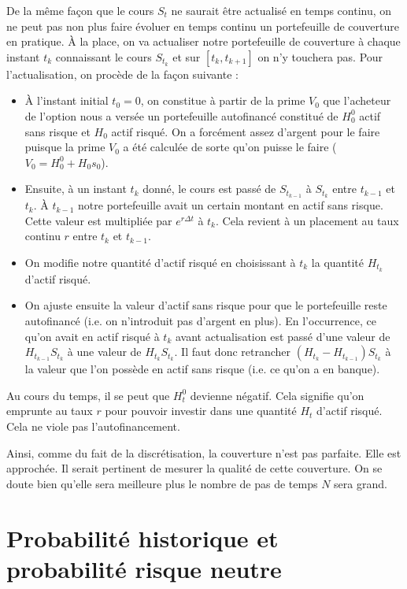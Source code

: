 \documentclass[12pt]{article}
\begin{document}
De la même façon que le cours $S_t$ ne saurait être actualisé en temps continu, on ne peut pas non plus faire évoluer en temps continu un portefeuille de couverture en pratique. À la place, on va actualiser notre portefeuille de couverture à chaque instant $t_k$ connaissant le cours $S_{t_k}$ et sur $[t_k, t_{k+1}]$ on n'y touchera pas. Pour l'actualisation, on procède de la façon suivante :
\begin{itemize}
    \item À l'instant initial $t_0=0$, on constitue à partir de la prime $V_0$ que l'acheteur de l'option nous a versée un portefeuille autofinancé constitué de $H^0_0$ actif sans risque et $H_0$ actif risqué. On a forcément assez d'argent pour le faire puisque la prime $V_0$ a été calculée de sorte qu'on puisse le faire ($V_0=H^0_0+H_0 s_0$).
    \item Ensuite, à un instant $t_k$ donné, le cours est passé de $S_{t_{k-1}}$ à $S_{t_k}$ entre $t_{k-1}$ et $t_k$. À $t_{k-1}$ notre portefeuille avait un certain montant en actif sans risque. Cette valeur est multipliée par $e^{r \Delta t}$ à $t_k$. Cela revient à un placement au taux continu $r$ entre $t_k$ et $t_{k-1}$.
    \item On modifie notre quantité d'actif risqué en choisissant à $t_k$ la quantité $H_{t_k}$ d'actif risqué.
    \item On ajuste ensuite la valeur d'actif sans risque pour que le portefeuille reste autofinancé (i.e. on n'introduit pas d'argent en plus). En l'occurrence, ce qu'on avait en actif risqué à $t_k$ avant actualisation est passé d'une valeur de $H_{t_{k-1}}S_{t_k}$ à une valeur de $H_{t_k} S_{t_k}$. Il faut donc retrancher $(H_{t_k}-H_{t_{k-1}})S_{t_k}$ à la valeur que l'on possède en actif sans risque (i.e. ce qu'on a en banque).
\end{itemize}
Au cours du temps, il se peut que $H^0_t$ devienne négatif. Cela signifie qu'on emprunte au taux $r$ pour pouvoir investir dans une quantité $H_t$ d'actif risqué. Cela ne viole pas l'autofinancement.

Ainsi, comme du fait de la discrétisation, la couverture n'est pas parfaite. Elle est approchée. Il serait pertinent de mesurer la qualité de cette couverture. On se doute bien qu'elle sera meilleure plus le nombre de pas de temps $N$ sera grand.  

\section{Probabilité historique et probabilité risque neutre}
\end{document}
